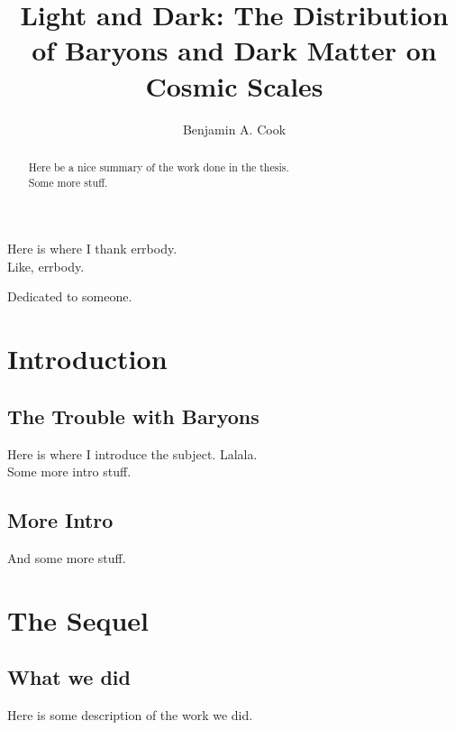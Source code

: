 \documentclass{puthesis_undergraduate}
\title{Light and Dark: The Distribution of Baryons and Dark Matter on \\
  Cosmic Scales}
\author{Benjamin A. Cook}
\begin{document}

\begin{abstract}
Here be a nice summary of the work done in the thesis.\\

Some more stuff.\\

\end{abstract}

\begin{acknowledgements}
Here is where I thank errbody.\\
Like, errbody.\\
\end{acknowledgements}

\begin{dedication}
Dedicated to someone.
\end{dedication}

\chapter{Introduction}
\label{c.Intro}
\section{The Trouble with Baryons}
\label{s.Trouble}
Here is where I introduce the subject. Lalala.\\

Some more intro stuff.\\

\section{More Intro}
\label{s.More}
And some more stuff.\\

\chapter{The Sequel}
\label{c.Sequel}
\section{What we did}
\label{s.Work}
Here is some description of the work we did.\\
\end{document}
